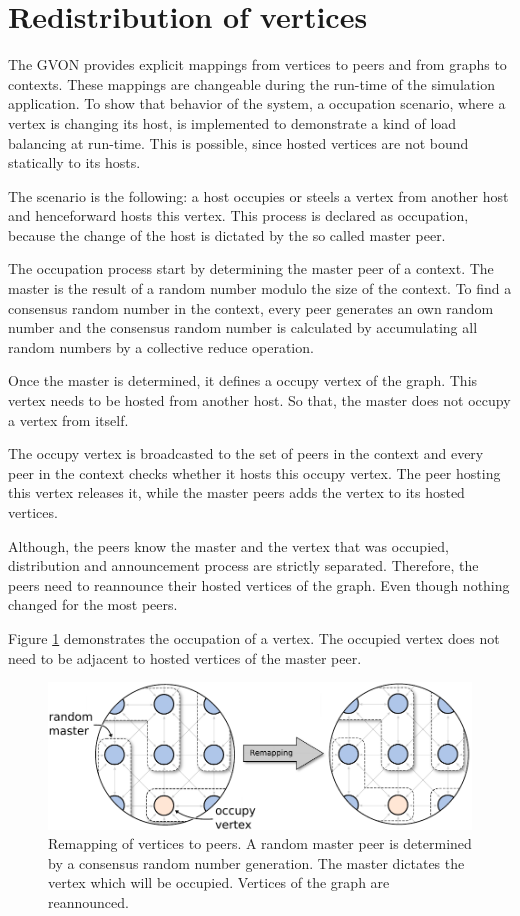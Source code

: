 \section{Redistribution of vertices}

The GVON provides explicit mappings from vertices to peers and from
graphs to contexts. These mappings are changeable during the run-time
of the simulation application.  To show that behavior of the system, a
occupation scenario, where a vertex is changing its host, is
implemented to demonstrate a kind of load balancing at run-time. This
is possible, since hosted vertices are not bound statically to its
hosts.

The scenario is the following: a host occupies or steels a vertex
from another host and henceforward hosts this vertex.  This process
is declared as occupation, because the change of the host is
dictated by the so called master peer.

The occupation process start by determining the master peer of a
context. The master is the result of a random number modulo the size
of the context. To find a consensus random number in the context,
every peer generates an own random number and the consensus random
number is calculated by accumulating all random numbers by a
collective reduce operation.

Once the master is determined, it defines a occupy vertex of the
graph. This vertex needs to be hosted from another host. So that,
the master does not occupy a vertex from itself.

The occupy vertex is broadcasted to the set of peers in the context
and every peer in the context checks whether it hosts this occupy
vertex. The peer hosting this vertex releases it, while the master
peers adds the vertex to its hosted vertices.

Although, the peers know the master and the vertex that was occupied,
distribution and announcement process are strictly
separated. Therefore, the peers need to reannounce their hosted
vertices of the graph. Even though nothing changed for the most peers.


Figure \ref{fig:gol_remapping} demonstrates the occupation of a
vertex.  The occupied vertex does not need to be adjacent to hosted
vertices of the master peer.

  \begin{figure}[H]
    \centering
    \includegraphics[width=\textwidth]{graphics/40_gol_remapping}
    \caption{Remapping of vertices to peers. A random master peer is
      determined by a consensus random number generation. The master
      dictates the vertex which will be occupied. Vertices of the
      graph are reannounced.}
    \label{fig:gol_remapping}
  \end{figure}

